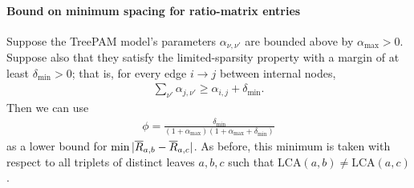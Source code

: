\documentclass{article}
\theoremstyle{definition}
\newcommand{\deltaMin}{\delta_{\text{min}}}
\newcommand{\alphaMax}{\alpha_{\text{max}}}
\newcommand{\LCA}{\text{LCA}}
\begin{document}

\paragraph{Bound on minimum spacing for ratio-matrix entries}
Suppose the TreePAM model's parameters $\alpha_{\nu,\nu'}$ are bounded above by $\alphaMax > 0$.
Suppose also that they satisfy the limited-sparsity property with a margin of at least $\deltaMin > 0$; that is, for every edge $i \to j$ between internal nodes,
\begin{align*}
\sum_{\nu'} \alpha_{j,\nu'} \geq \alpha_{i,j} + \deltaMin.
\end{align*}
Then we can use
\begin{align*}
\phi = \frac{\deltaMin}{(1+\alphaMax)(1+\alphaMax+\deltaMin)}
\end{align*}
as a lower bound for $\min |\overline{R}_{a,b} - \overline{R}_{a,c}|$.
As before, this minimum is taken with respect to all triplets of distinct leaves $a, b, c$ such that $\LCA(a,b) \neq \LCA(a,c)$.
\end{document}
